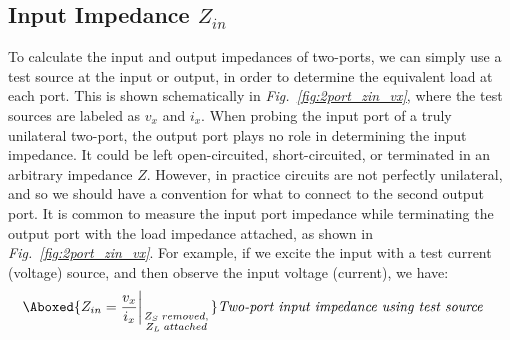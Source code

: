\subsection{Input Impedance \texorpdfstring{$Z_{in}$}{}}
To calculate the input and output impedances of two-ports, we can simply use a test source at the input or output, in order to determine the equivalent load at each port.  This is shown schematically in \emph{Fig.~\ref{fig:2port_zin_vx}}, where the test sources are labeled as $v_x$ and $i_x$.  When probing the input port of a truly unilateral two-port, the output port plays no role in determining the input impedance.  It could be left open-circuited, short-circuited, or terminated in an arbitrary impedance $Z$.  However, in practice circuits are not perfectly unilateral, and so we should have a convention for what to connect to the second output port.  It is common to measure the input port impedance while terminating the output port with the load impedance attached, as shown in \emph{Fig.~\ref{fig:2port_zin_vx}}.  For example, if we excite the input with a test current (voltage) source, and then observe the input voltage (current), we have:
    \begin{align}
        \Aboxed{Z_{in} = \frac{v_x}{i_x}\bigg\rvert_{\genfrac{}{}{0pt}{2}
            {\scriptstyle{Z_S}\;removed,}
            {\scriptstyle{Z_L}\;attached}}}
            &\textit{Two-port input impedance using test source}
    \end{align}
